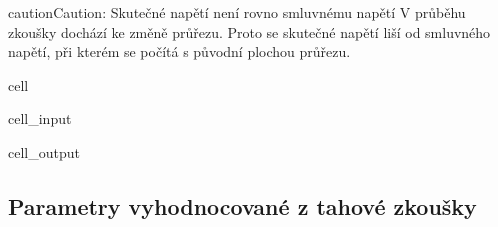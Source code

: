 \documentclass[letterpaper,10pt,english]{jupyterBook}
\begin{document}
\begin{sphinxadmonition}{caution}{Caution:}
\sphinxAtStartPar
Skutečné napětí není rovno smluvnému napětí
V průběhu zkoušky dochází ke změně průřezu. Proto se skutečné napětí liší od smluvného napětí, při kterém se počítá s původní plochou průřezu.
\end{sphinxadmonition}

\begin{sphinxuseclass}{cell}\begin{sphinxVerbatimInput}

\begin{sphinxuseclass}{cell_input}
\begin{sphinxVerbatim}[commandchars=\\\{\}]
 
\end{sphinxVerbatim}

\end{sphinxuseclass}\end{sphinxVerbatimInput}
\begin{sphinxVerbatimOutput}

\begin{sphinxuseclass}{cell_output}
\noindent{}

\end{sphinxuseclass}\end{sphinxVerbatimOutput}

\end{sphinxuseclass}

\subsection{Parametry vyhodnocované z tahové zkoušky}
\label{\detokenize{Prednasky/2_3_Tahov_xe1_zkou_u0161ka:parametry-vyhodnocovane-z-tahove-zkousky}}
\noindent{}
\end{document}
